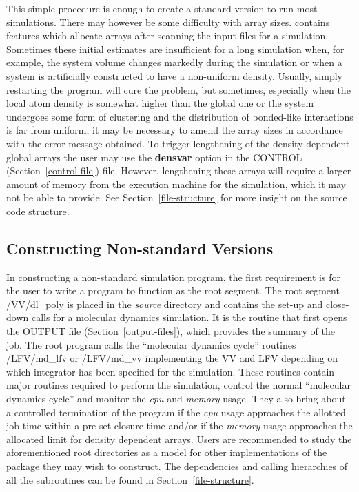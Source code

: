 This simple procedure is enough to create a standard version to run
most simulations.  There may however be some difficulty with array
sizes.  \D contains features which allocate arrays after scanning
the input files for a simulation.  Sometimes these initial estimates
are insufficient for a long simulation when, for example, the system
volume changes markedly during the simulation or when a system is
artificially constructed to have a non-uniform density. Usually,
simply restarting the program will cure the problem, but sometimes,
especially when the local atom density is somewhat higher than the
global one or the system undergoes some form of clustering 
and the distribution of bonded-like interactions is far from uniform,
it may be necessary to amend the array sizes in accordance with the
error message obtained.  To trigger lengthening of the density
dependent global arrays the user may use the {\bf densvar} option in
the CONTROL (Section~\ref{control-file}) file.  However, lengthening
these arrays will require a larger amount of memory from the
execution machine for the simulation, which it may not be able to
provide.  See Section~\ref{file-structure} for more insight on the
\D source code structure.

\subsection{Constructing Non-standard Versions}

In constructing a non-standard \D simulation program, the first
requirement is for the user to write a program to function as the
root segment.  The root segment {\sc /VV/dl\_poly} is placed in the
{\em source} directory and contains the set-up and close-down calls
for a molecular dynamics simulation.  It is the routine that first
opens the OUTPUT file (Section~\ref{output-files}), which provides
the summary of the job.  The root program calls the ``molecular
dynamics cycle'' routines {\sc /LFV/md\_lfv} or {\sc /LFV/md\_vv}
implementing the VV and LFV depending on which integrator has been
specified for the simulation. These routines contain major routines
required to perform the simulation, control the normal ``molecular
dynamics cycle'' and monitor the {\em cpu} and {\em memory} usage.
They also bring about a controlled termination of the program if
the {\em cpu} usage approaches the allotted job time within a
pre-set closure time and/or if the {\em memory} usage approaches the
allocated limit for density dependent arrays.   Users are
recommended to study the aforementioned root directories as a model for
other implementations of the package they may wish to construct. The
dependencies and calling hierarchies of all the \D subroutines can
be found in Section~\ref{file-structure}.

